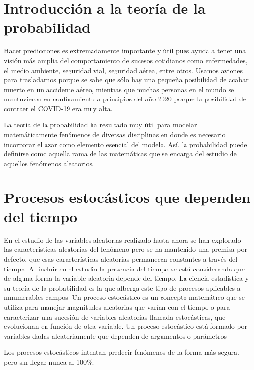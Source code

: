 \documentclass[a4paper,11pt]{book}
\begin{document}
\chapter{Introducción a la teoría de la probabilidad}
    Hacer predicciones es extremadamente importante y útil pues ayuda a tener una visión más amplia del comportamiento de sucesos cotidianos como enfermedades, el medio ambiente, seguridad vial, seguridad aérea, entre otros.
    Usamos aviones para trasladarnos porque se sabe que sólo hay una pequeña posibilidad de acabar muerto en un accidente aéreo, mientras que muchas personas en el mundo se mantuvieron en confinamiento a principios del año 2020 porque la posibilidad de contraer el COVID-19 era muy alta.
    
    La teoría de la probabilidad ha resultado muy útil para modelar
    matemáticamente fenómenos de diversas disciplinas en donde es necesario incorporar el azar como elemento esencial del modelo. Así, la probabilidad puede definirse como
    aquella rama de las matemáticas que se encarga del estudio de aquellos fenómenos aleatorios.
    
    
    
    
    
    

\chapter{Procesos estocásticos que dependen del tiempo}
    En el estudio de las variables aleatorias realizado hasta ahora se han explorado las características aleatorias del fenómeno pero se ha mantenido una premisa por defecto, que esas
    características aleatorias permanecen constantes a través del tiempo. Al incluir en el estudio la presencia del tiempo se está considerando que de alguna forma la variable aleatoria depende del tiempo.
    La ciencia estadística y su teoría de la probabilidad es la que alberga este tipo de procesos aplicables a innumerables campos. Un proceso estocástico es un concepto matemático que se utiliza para manejar magnitudes aleatorias que varían con el tiempo o para caracterizar una sucesión de variables aleatorias llamada estocásticas, que evolucionan en función de otra variable. Un proceso estocástico está formado por variables dadas aleatoriamente que dependen de argumentos o parámetros

    Los procesos estocásticos intentan predecir fenómenos de la forma más segura. pero sin llegar nunca al 100\%.
    
\end{document}
